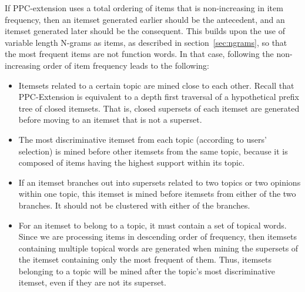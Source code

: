 \documentclass[letterpaper,12pt,titlepage,oneside,final]{book}
\begin{document}
If PPC-extension uses a total ordering 
of items that is non-increasing in item frequency,
then 
an itemset generated earlier %
should be the antecedent, and
an itemset generated later
should be the consequent.
This builds upon the use of
variable length N-grams
as items,
as described in section~\ref{sec:ngrams},
so that the most frequent items
are not function words.
In that case, following the non-increasing order 
of item frequency leads to the following:
\begin{itemize}
\item Itemsets related to a certain topic are mined close to each other.
Recall that PPC-Extension is equivalent to a depth first traversal 
of a hypothetical prefix tree of closed itemsets.
That is, closed supersets of each itemset are generated before 
moving to an itemset that is not a superset. 
\item The most discriminative itemset from each topic (according to users' selection) is mined 
before other itemsets from the same topic, 
because it is composed of items having the highest support within its topic.
\item If an itemset branches out into supersets related to two topics 
or two opinions within one topic, this itemset is mined before itemsets from 
either of the two branches. It should not 
be clustered with either of the branches.
\item 
For an itemset to belong to a topic, it must contain a set of topical words. 
Since we are processing items in descending order of frequency, 
then itemsets containing multiple topical words are generated
when mining the supersets of the itemset containing only 
the most frequent of them.
Thus, itemsets belonging to a topic
will be mined after the topic's most discriminative itemset,
even if they are not its superset.
\end{itemize}
\end{document}
